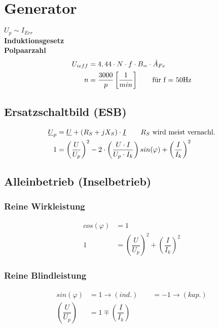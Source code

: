 \section{Generator}
$U_p \sim I_{Err}$\\
\textbf{Induktionsgesetz}\\
\textbf{Polpaarzahl}
\begin{align*}
    U_{ieff} &= 4,44 \cdot N \cdot f \cdot B_= \cdot \hat{A}_{Fe} \\
    n &= \dfrac{3000}{p} \left[ \frac{1}{min}\right] \qquad \textnormal{für f = 50Hz}
\end{align*}

\subsection{Ersatzschaltbild (ESB)}
\begin{align*}
    \underline{U}_p &= \underline{U} + (R_S + jX_S) \cdot \underline{I} \qquad \textnormal{$R_S$ wird meist vernachl.}\\
    1 &= \left( \dfrac{U}{U_p} \right)^2 - 2 \cdot \left( \dfrac{U \cdot I}{U_p \cdot I_k}\right) sin(\varphi) + \left(\dfrac{I}{I_k}\right)^2
\end{align*}

\subsection{Alleinbetrieb (Inselbetrieb)}
\subsubsection{Reine Wirkleistung}
\begin{align*}
    cos(\varphi) &= 1\\
    1 &= \left( \dfrac{U}{U_p} \right)^2 + \left(\dfrac{I}{I_k}\right)^2
\end{align*}

\subsubsection{Reine Blindleistung}
\begin{align*}
    sin(\varphi) &= 1 \rightarrow (ind.) \qquad =-1 \rightarrow (kap.)\\
    \left( \dfrac{U}{U_p} \right) &= 1 \mp \left(\dfrac{I}{I_k}\right)
\end{align*}

